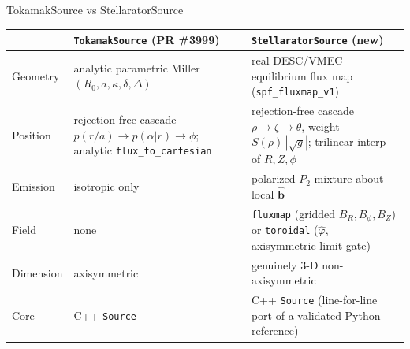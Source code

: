 \documentclass[11pt,aspectratio=169]{beamer}
\newcommand{\bhat}{\hat{\mathbf{b}}}
\begin{document}
\begin{frame}{TokamakSource vs StellaratorSource}
\scriptsize
\begin{tabular}{@{}p{2.3cm}p{4.4cm}p{4.6cm}@{}}
\toprule
 & \texttt{TokamakSource} (PR \#3999) & \texttt{StellaratorSource} (new) \\
\midrule
Geometry & analytic parametric Miller $(R_0,a,\kappa,\delta,\Delta)$ & real DESC/VMEC
   equilibrium flux map (\texttt{spf\_fluxmap\_v1}) \\
Position & rejection-free cascade $p(r/a)\!\to\!p(\alpha|r)\!\to\!\phi$; analytic
   \texttt{flux\_to\_cartesian} & rejection-free cascade $\rho\!\to\!\zeta\!\to\!\theta$,
   weight $S(\rho)\,|\sqrt{g}|$; trilinear interp of $R,Z,\phi$ \\
Emission & isotropic only & polarized $P_2$ mixture about local $\bhat$ \\
Field & none & \texttt{fluxmap} (gridded $B_R,B_\phi,B_Z$) or \texttt{toroidal}
   ($\hat\varphi$, axisymmetric-limit gate) \\
Dimension & axisymmetric & genuinely 3-D non-axisymmetric \\
Core & C++ \texttt{Source} & C++ \texttt{Source} (line-for-line port of a validated
   Python reference) \\
\bottomrule
\end{tabular}
\end{frame}
\end{document}
